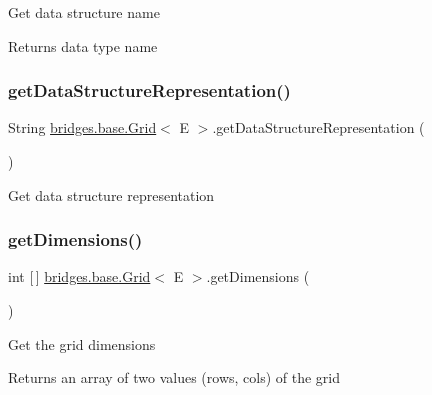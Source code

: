 Get data structure name \begin{DoxyReturn}{Returns}
data type name 
\end{DoxyReturn}
\mbox{\label{classbridges_1_1base_1_1_grid_a9a7faf2bbabae8d2f2babe9e29deb2c8}} 
\subsubsection{\texorpdfstring{getDataStructureRepresentation()}{getDataStructureRepresentation()}}
{\footnotesize\ttfamily String \mbox{\hyperlink{classbridges_1_1base_1_1_grid}{bridges.\+base.\+Grid}}$<$ E $>$.get\+Data\+Structure\+Representation (\begin{DoxyParamCaption}{ }\end{DoxyParamCaption})}

Get data structure representation \mbox{\label{classbridges_1_1base_1_1_grid_aee8a5b66095d65ff067a4e76f2611b0e}} 
\subsubsection{\texorpdfstring{getDimensions()}{getDimensions()}}
{\footnotesize\ttfamily int \mbox{[}$\,$\mbox{]} \mbox{\hyperlink{classbridges_1_1base_1_1_grid}{bridges.\+base.\+Grid}}$<$ E $>$.get\+Dimensions (\begin{DoxyParamCaption}{ }\end{DoxyParamCaption})}

Get the grid dimensions

\begin{DoxyReturn}{Returns}
an array of two values (rows, cols) of the grid 
\end{DoxyReturn}
\mbox{\label{classbridges_1_1base_1_1_grid_ab79ceb737423bb28ea2348e61a625a17}} 
